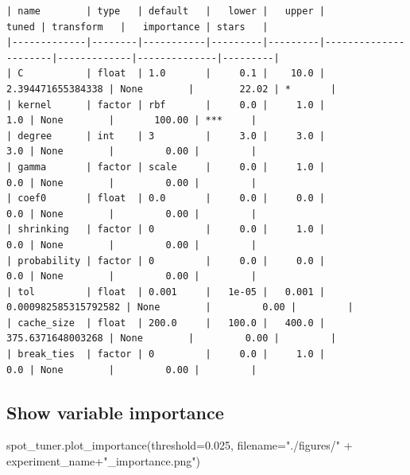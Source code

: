 \documentclass[
  letterpaper,
  DIV=11,
  numbers=noendperiod]{scrreprt}
\newenvironment{Shaded}{\begin{snugshade}}{\end{snugshade}}
\newcommand{\FloatTok}[1]{\textcolor[rgb]{0.68,0.00,0.00}{#1}}
\newcommand{\NormalTok}[1]{\textcolor[rgb]{0.00,0.23,0.31}{#1}}
\newcommand{\OperatorTok}[1]{\textcolor[rgb]{0.37,0.37,0.37}{#1}}
\newcommand{\StringTok}[1]{\textcolor[rgb]{0.13,0.47,0.30}{#1}}
\begin{document}
\begin{verbatim}
| name        | type   | default   |   lower |   upper |                tuned | transform   |   importance | stars   |
|-------------|--------|-----------|---------|---------|----------------------|-------------|--------------|---------|
| C           | float  | 1.0       |     0.1 |    10.0 |    2.394471655384338 | None        |        22.02 | *       |
| kernel      | factor | rbf       |     0.0 |     1.0 |                  1.0 | None        |       100.00 | ***     |
| degree      | int    | 3         |     3.0 |     3.0 |                  3.0 | None        |         0.00 |         |
| gamma       | factor | scale     |     0.0 |     1.0 |                  0.0 | None        |         0.00 |         |
| coef0       | float  | 0.0       |     0.0 |     0.0 |                  0.0 | None        |         0.00 |         |
| shrinking   | factor | 0         |     0.0 |     1.0 |                  0.0 | None        |         0.00 |         |
| probability | factor | 0         |     0.0 |     0.0 |                  0.0 | None        |         0.00 |         |
| tol         | float  | 0.001     |   1e-05 |   0.001 | 0.000982585315792582 | None        |         0.00 |         |
| cache_size  | float  | 200.0     |   100.0 |   400.0 |    375.6371648003268 | None        |         0.00 |         |
| break_ties  | factor | 0         |     0.0 |     1.0 |                  0.0 | None        |         0.00 |         |
\end{verbatim}

\hypertarget{show-variable-importance}{%
\subsection{Show variable importance}\label{show-variable-importance}}

\begin{Shaded}
\begin{Highlighting}[]
\NormalTok{spot\_tuner.plot\_importance(threshold}\OperatorTok{=}\FloatTok{0.025}\NormalTok{, filename}\OperatorTok{=}\StringTok{"./figures/"} \OperatorTok{+}\NormalTok{ experiment\_name}\OperatorTok{+}\StringTok{"\_importance.png"}\NormalTok{)}
\end{Highlighting}
\end{Shaded}
\end{document}
